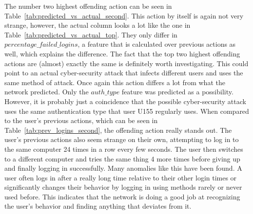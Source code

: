 The number two highest offending action can be seen in Table~\ref{tab:predicted_vs_actual_second}. This action by itself is again not very strange, however, the actual column looks a lot like the one in Table~\ref{tab:predicted_vs_actual_top}. They only differ in \(percentage\_failed\_logins \), a feature that is calculated over previous actions as well, which explains the difference. The fact that the top two highest offending actions are (almost) exactly the same is definitely worth investigating. This could point to an actual cyber-security attack that infects different users and uses the same method of attack. Once again this action differs a lot from what the network predicted. Only the \(auth\_type \) feature was predicted as a possibility. However, it is probably just a coincidence that the possible cyber-security attack uses the same authentication type that user U155 regularly uses. When compared to the user's previous actions, which can be seen in Table~\ref{tab:prev_logins_second}, the offending action really stands out. The user's previous actions also seem strange on their own, attempting to log in to the same computer 24 times in a row every few seconds. The user then switches to a different computer and tries the same thing 4 more times before giving up and finally logging in successfully. Many anomalies like this have been found. A user often logs in after a really long time relative to their other login times or significantly changes their behavior by logging in using methods rarely or never used before. This indicates that the network is doing a good job at recognizing the user's behavior and finding anything that deviates from it.

